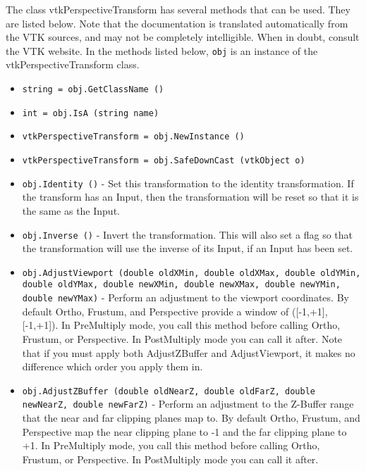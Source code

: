 The class vtkPerspectiveTransform has several methods that can be used.
  They are listed below.
Note that the documentation is translated automatically from the VTK sources,
and may not be completely intelligible.  When in doubt, consult the VTK website.
In the methods listed below, \verb|obj| is an instance of the vtkPerspectiveTransform class.
\begin{itemize}
\item  \verb|string = obj.GetClassName ()|

\item  \verb|int = obj.IsA (string name)|

\item  \verb|vtkPerspectiveTransform = obj.NewInstance ()|

\item  \verb|vtkPerspectiveTransform = obj.SafeDownCast (vtkObject o)|

\item  \verb|obj.Identity ()| -  Set this transformation to the identity transformation.  If 
 the transform has an Input, then the transformation will be
 reset so that it is the same as the Input.

\item  \verb|obj.Inverse ()| -  Invert the transformation.  This will also set a flag so that
 the transformation will use the inverse of its Input, if an Input
 has been set.

\item  \verb|obj.AdjustViewport (double oldXMin, double oldXMax, double oldYMin, double oldYMax, double newXMin, double newXMax, double newYMin, double newYMax)| -  Perform an adjustment to the viewport coordinates.  By default Ortho,
 Frustum, and Perspective provide a window of ([-1,+1],[-1,+1]).
 In PreMultiply mode, you call this method before calling Ortho, Frustum,
 or Perspective.  In PostMultiply mode you can call it after.  Note
 that if you must apply both AdjustZBuffer and AdjustViewport, it
 makes no difference which order you apply them in.

\item  \verb|obj.AdjustZBuffer (double oldNearZ, double oldFarZ, double newNearZ, double newFarZ)| -  Perform an adjustment to the Z-Buffer range that the near and far
 clipping planes map to.  By default Ortho, Frustum, and Perspective
 map the near clipping plane to -1 and the far clipping plane to +1.
 In PreMultiply mode, you call this method before calling Ortho, Frustum,
 or Perspective.  In PostMultiply mode you can call it after.


\end{itemize}
